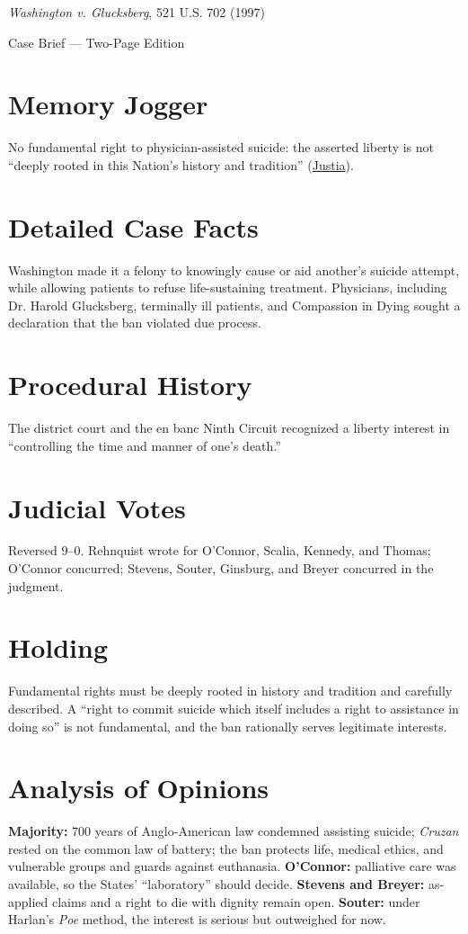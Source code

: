\documentclass[12pt]{article}
\begin{document}
\begin{center}
{\LARGE \textit{Washington v. Glucksberg}, 521 U.S. 702 (1997)\par}
\vspace{0.5em}
{\large Case Brief --- Two-Page Edition\par}
\end{center}

\section{Memory Jogger}
No fundamental right to physician-assisted suicide: the asserted liberty is not ``deeply rooted in this Nation's history and tradition'' (\href{https://supreme.justia.com/cases/federal/us/521/702/}{Justia}).

\section{Detailed Case Facts}
Washington made it a felony to knowingly cause or aid another's suicide attempt, while allowing patients to refuse life-sustaining treatment. Physicians, including Dr. Harold Glucksberg, terminally ill patients, and Compassion in Dying sought a declaration that the ban violated due process.

\section{Procedural History}
The district court and the en banc Ninth Circuit recognized a liberty interest in ``controlling the time and manner of one's death.''

\section{Judicial Votes}
Reversed 9--0. Rehnquist wrote for O'Connor, Scalia, Kennedy, and Thomas; O'Connor concurred; Stevens, Souter, Ginsburg, and Breyer concurred in the judgment.

\section{Holding}
Fundamental rights must be deeply rooted in history and tradition and carefully described. A ``right to commit suicide which itself includes a right to assistance in doing so'' is not fundamental, and the ban rationally serves legitimate interests.

\section{Analysis of Opinions}
\textbf{Majority:} 700 years of Anglo-American law condemned assisting suicide; \textit{Cruzan} rested on the common law of battery; the ban protects life, medical ethics, and vulnerable groups and guards against euthanasia. \textbf{O'Connor:} palliative care was available, so the States' ``laboratory'' should decide. \textbf{Stevens and Breyer:} as-applied claims and a right to die with dignity remain open. \textbf{Souter:} under Harlan's \textit{Poe} method, the interest is serious but outweighed for now.
\end{document}

